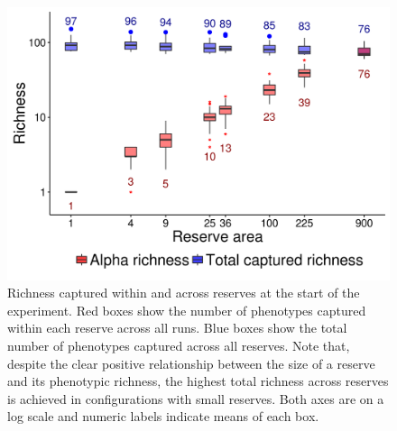 \documentclass[letterpaper]{article}
\begin{document}
\begin{figure}[h]
	\centering
	\includegraphics[]{CapturedRichness.png}
    \caption{Richness captured within and across reserves at the start of the experiment. Red boxes show the number of phenotypes captured within each reserve across all runs. Blue boxes show the total number of phenotypes captured across all reserves. Note that, despite the clear positive relationship between the size of a reserve and its phenotypic richness, the highest total richness across reserves is achieved in configurations with small reserves. Both axes are on a log scale and numeric labels indicate means of each box.}
%
%
%
%
    \label{fig:capturedrichness}
\end{figure}
\end{document}
